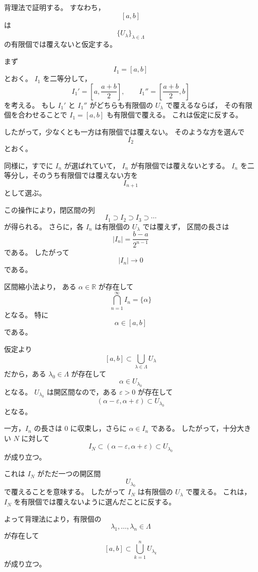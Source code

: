 \begin{strategy}
	背理法で証明する。
	すなわち，
	\[
	[a,b]
	\]
	は
	\[
	\{U_\lambda\}_{\lambda\in\Lambda}
	\]
	の有限個では覆えないと仮定する。
	
	まず
	\[
	I_1=[a,b]
	\]
	とおく。
	\(I_1\) を二等分して，
	\[
	I_1'
	=
	\left[
	a,\frac{a+b}{2}
	\right],
	\qquad
	I_1''
	=
	\left[
	\frac{a+b}{2},b
	\right]
	\]
	を考える。
	もし \(I_1'\) と \(I_1''\) がどちらも有限個の
	\(U_\lambda\) で覆えるならば，
	その有限個を合わせることで \(I_1=[a,b]\) も有限個で覆える。
	これは仮定に反する。
	
	したがって，少なくとも一方は有限個では覆えない。
	そのような方を選んで
	\[
	I_2
	\]
	とおく。
	
	同様に，すでに \(I_n\) が選ばれていて，
	\(I_n\) が有限個では覆えないとする。
	\(I_n\) を二等分し，そのうち有限個では覆えない方を
	\[
	I_{n+1}
	\]
	として選ぶ。
	
	この操作により，閉区間の列
	\[
	I_1\supset I_2\supset I_3\supset\cdots
	\]
	が得られる。
	さらに，各 \(I_n\) は有限個の \(U_\lambda\) では覆えず，
	区間の長さは
	\[
	|I_n|=\frac{b-a}{2^{n-1}}
	\]
	である。
	したがって
	\[
	|I_n|\to 0
	\]
	である。
	
	区間縮小法より，
	ある \(\alpha\in\mathbb{R}\) が存在して
	\[
	\bigcap_{n=1}^{\infty}I_n
	=
	\{\alpha\}
	\]
	となる。
	特に
	\[
	\alpha\in [a,b]
	\]
	である。
	
	仮定より
	\[
	[a,b]\subset
	\bigcup_{\lambda\in\Lambda}U_\lambda
	\]
	だから，ある \(\lambda_0\in\Lambda\) が存在して
	\[
	\alpha\in U_{\lambda_0}
	\]
	となる。
	\(U_{\lambda_0}\) は開区間なので，ある \(\varepsilon>0\) が存在して
	\[
	(\alpha-\varepsilon,\alpha+\varepsilon)
	\subset
	U_{\lambda_0}
	\]
	となる。
	
	一方，\(I_n\) の長さは \(0\) に収束し，さらに
	\(\alpha\in I_n\) である。
	したがって，十分大きい \(N\) に対して
	\[
	I_N
	\subset
	(\alpha-\varepsilon,\alpha+\varepsilon)
	\subset
	U_{\lambda_0}
	\]
	が成り立つ。
	
	これは \(I_N\) がただ一つの開区間
	\[
	U_{\lambda_0}
	\]
	で覆えることを意味する。
	したがって \(I_N\) は有限個の \(U_\lambda\) で覆える。
	これは，\(I_N\) を有限個では覆えないように選んだことに反する。
	
	よって背理法により，有限個の
	\[
	\lambda_1,\ldots,\lambda_n\in\Lambda
	\]
	が存在して
	\[
	[a,b]\subset
	\bigcup_{k=1}^{n}U_{\lambda_k}
	\]
	が成り立つ。
\end{strategy}